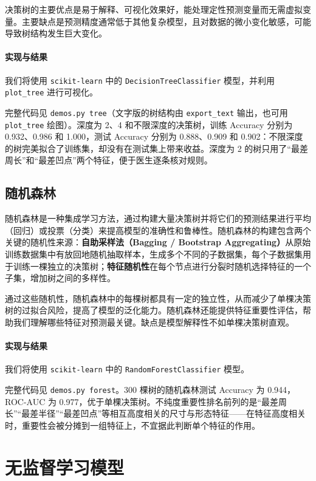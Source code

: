 决策树的主要优点是易于解释、可视化效果好，能处理定性预测变量而无需虚拟变量。主要缺点是预测精度通常低于其他复杂模型，且对数据的微小变化敏感，可能导致树结构发生巨大变化。

\paragraph{实现与结果}
我们将使用 \texttt{scikit-learn} 中的 \texttt{DecisionTreeClassifier} 模型，并利用 \texttt{plot\_tree} 进行可视化。

完整代码见 \texttt{demos.py tree}（文字版的树结构由 \texttt{export\_text} 输出，也可用 \texttt{plot\_tree} 绘图）。深度为 2、4 和不限深度的决策树，训练 Accuracy 分别为 0.932、0.986 和 1.000，测试 Accuracy 分别为 0.888、0.909 和 0.902：不限深度的树完美拟合了训练集，却没有在测试集上带来收益。深度为 2 的树只用了“最差周长”和“最差凹点”两个特征，便于医生逐条核对规则。

\subsection{随机森林}

随机森林是一种集成学习方法，通过构建大量决策树并将它们的预测结果进行平均（回归）或投票（分类）来提高模型的准确性和鲁棒性。随机森林的构建包含两个关键的随机性来源：\textbf{自助采样法（Bagging / Bootstrap Aggregating）}从原始训练数据集中有放回地随机抽取样本，生成多个不同的子数据集，每个子数据集用于训练一棵独立的决策树；\textbf{特征随机性}在每个节点进行分裂时随机选择特征的一个子集，增加树之间的多样性。

通过这些随机性，随机森林中的每棵树都具有一定的独立性，从而减少了单棵决策树的过拟合风险，提高了模型的泛化能力。随机森林还能提供特征重要性评估，帮助我们理解哪些特征对预测最关键。缺点是模型解释性不如单棵决策树直观。

\paragraph{实现与结果}
我们将使用 \texttt{scikit-learn} 中的 \texttt{RandomForestClassifier} 模型。

完整代码见 \texttt{demos.py forest}。300 棵树的随机森林测试 Accuracy 为 0.944，ROC-AUC 为 0.977，优于单棵决策树。不纯度重要性排名前列的是“最差周长”“最差半径”“最差凹点”等相互高度相关的尺寸与形态特征——在特征高度相关时，重要性会被分摊到一组特征上，不宜据此判断单个特征的作用。

\section{无监督学习模型}

